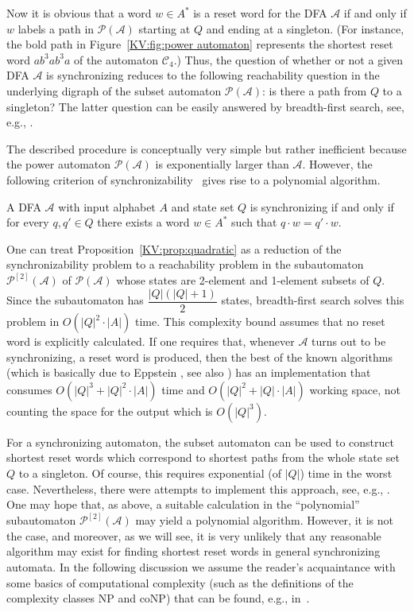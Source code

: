 \documentclass{irmaart}
\newcommand{\sa}{synchronizing au\-tom\-a\-ta}
\newcommand{\san}{synchronizing au\-tom\-a\-ton}
\begin{document}
Now it is obvious that a word $w\in A^*$ is a reset word for the
DFA $\mathcal{A}$ if and only if $w$ labels a path in
$\mathcal{P}(\mathcal{A})$ starting at $Q$ and ending at a
singleton. (For instance, the bold path in
Figure~\ref{KV:fig:power automaton} represents the shortest reset
word $ab^3ab^3a$ of the automaton $\mathcal{C}_4$.) Thus, the
question of whether or not a given DFA $\mathcal{A}$ is
synchronizing reduces to the following reachability question in
the underlying digraph of the subset automaton
$\mathcal{P}(\mathcal{A})$: is there a path from $Q$ to a
singleton? The latter question can be easily answered by
breadth-first search,  see, e.g.,
\cite[Section~22.2]{Cormen&Leiserson&Rivest&Stein:2001}.

The described procedure is conceptually very simple but rather
inefficient because the power automaton $\mathcal{P}(\mathcal{A})$
is exponentially larger than $\mathcal{A}$. However, the following
criterion of synchronizability~\cite[Theorem~2]{Cerny:1964} gives
rise to a polynomial algorithm.
\begin{proposition}
\label{KV:prop:quadratic} A DFA $\mathcal{A}$ with input alphabet
$A$ and state set $Q$ is synchronizing if and only if for every
$q,q'\in Q$ there exists a word $w\in A^*$ such that $q\cdot
w=q'\cdot w$.
\end{proposition}
One can treat Proposition~\ref{KV:prop:quadratic} as a reduction
of the synchronizability problem to a reachability problem in the
subautomaton $\mathcal{P}^{[2]}(\mathcal{A})$ of
$\mathcal{P}(\mathcal{A})$ whose states are 2-element and
1-element subsets of $Q$. Since the subautomaton has
$\dfrac{|Q|(|Q|+1)}2$ states, breadth-first search solves this
problem in $O(|Q|^2\cdot|A|)$ time. This complexity bound assumes
that no reset word is explicitly calculated. If one requires that,
whenever $\mathcal{A}$ turns out to be synchronizing, a reset word
is produced, then the best of the known algorithms (which is
basically due to Eppstein \cite[Theorem~6]{Eppstein:1990}, see
also \cite[Theorem~1.15]{Sandberg:2005}) has an implementation
that consumes $O(|Q|^3 + |Q|^2\cdot|A|)$ time and $O(|Q|^2 +
|Q|\cdot|A|)$ working space, not counting the space for the output
which is $O(|Q|^3)$.

For a \san, the subset automaton can be used to construct shortest
reset words which correspond to shortest paths from the whole
state set $Q$ to a singleton. Of course, this requires exponential
(of $|Q|$) time in the worst case. Nevertheless, there were
attempts to implement this approach, see, e.g.,
\cite{Rho&Somenzi&Pixley:1993,Trahtman:2006}. One may hope that,
as above, a suitable calculation in the ``polynomial''
subautomaton $\mathcal{P}^{[2]}(\mathcal{A})$ may yield a
polynomial algorithm. However, it is not the case, and moreover,
as we will see, it is very unlikely that any reasonable algorithm
may exist for finding shortest reset words in general \sa. In the
following discussion we assume the reader's acquaintance with some
basics of computational complexity (such as the definitions of the
complexity classes \textsf{NP} and \textsf{coNP}) that can be
found, e.g., in~\cite{Garey&Johnson:1979,Papadimitriou:1994}.
\end{document}
